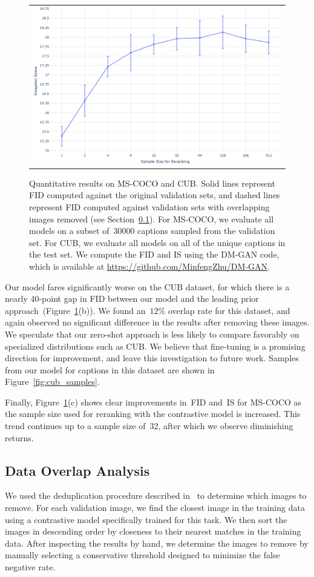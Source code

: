 \documentclass{article}
\begin{document}
\begin{figure}[t]
{\begin{tabular}{@{}c}
        \includegraphics[width=0.31\linewidth]{coco_is_clip_sample_size.png}%
        \end{tabular}%
    }%
    \caption{Quantitative results on MS-COCO and CUB. Solid lines represent FID computed against the original validation sets, and dashed lines represent FID computed against validation sets with overlapping images removed (see Section~\ref{sec:data_overlap_analysis}). For MS-COCO, we evaluate all models on a subset of~\num{30000} captions sampled from the validation set. For CUB, we evaluate all models on all of the unique captions in the test set. We compute the FID and IS using the DM-GAN code, which is available at \url{https://github.com/MinfengZhu/DM-GAN}.}
    \label{fig:quant_results}
\end{figure}

Our model fares significantly worse on the CUB dataset, for which there is a nearly 40-point gap in FID between our model and the leading prior approach~(Figure~\ref{fig:quant_results}(b)). We found an~$12\%$ overlap rate for this dataset, and again observed no significant difference in the results after removing these images. We speculate that our zero-shot approach is less likely to compare favorably on specialized distributions such as CUB. We believe that fine-tuning is a promising direction for improvement, and leave this investigation to future work. Samples from our model for captions in this dataset are shown in Figure~\ref{fig:cub_samples}.

Finally, Figure~\ref{fig:quant_results}(c) shows clear improvements in~FID and~IS for MS-COCO as the sample size used for reranking with the contrastive model is increased. This trend continues up to a sample size of~32, after which we observe diminishing returns.

\subsection{Data Overlap Analysis}
\label{sec:data_overlap_analysis}

We used the deduplication procedure described in~\citet{radford2021learning} to determine which images to remove. For each validation image, we find the closest image in the training data using a contrastive model specifically trained for this task. We then sort the images in descending order by closeness to their nearest matches in the training data. After inspecting the results by hand, we determine the images to remove by manually selecting a conservative threshold designed to minimize the false negative rate.
\end{document}
